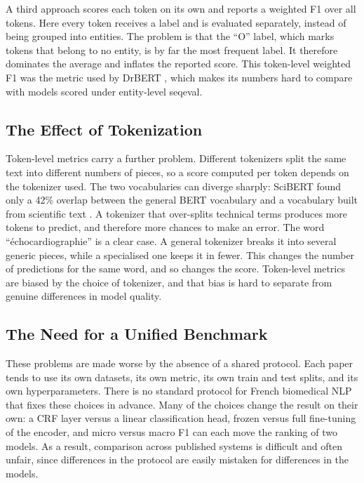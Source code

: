 A third approach scores each token on its own and reports a weighted F1 over all tokens. Here
every token receives a label and is evaluated separately, instead of being grouped into
entities. The problem is that the ``O'' label, which marks tokens that belong to no entity, is
by far the most frequent label. It therefore dominates the average and inflates the reported score.
This token-level weighted F1 was the metric used by DrBERT \citep{labrak2023drbert}, which
makes its numbers hard to compare with models scored under entity-level seqeval.

\subsection{The Effect of Tokenization}

Token-level metrics carry a further problem. Different tokenizers split the same text into
different numbers of pieces, so a score computed per token depends on the tokenizer used. The
two vocabularies can diverge sharply: SciBERT found only a 42\% overlap between the general
BERT vocabulary and a vocabulary built from scientific text \citep{beltagy_scibert_2019}. A
tokenizer that over-splits technical terms produces more tokens to predict, and therefore more
chances to make an error. The word ``échocardiographie'' is a clear case. A general tokenizer
breaks it into several generic pieces, while a specialised one keeps it in fewer. This changes the
number of predictions for the same word, and so changes the score. Token-level metrics are
biased by the choice of tokenizer, and that bias is hard to separate from genuine differences
in model quality.

\subsection{The Need for a Unified Benchmark}

These problems are made worse by the absence of a shared protocol. Each paper tends to use its
own datasets, its own metric, its own train and test splits, and its own hyperparameters. There
is no standard protocol for French biomedical NLP that fixes these choices in advance. Many of
the choices change the result on their own: a CRF layer versus a linear classification head,
frozen versus full fine-tuning of the encoder, and micro versus macro F1 can each move the
ranking of two models. As a result, comparison across published systems is difficult and
often unfair, since differences in the protocol are easily mistaken for differences in the
models.

